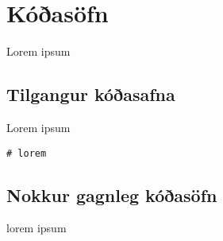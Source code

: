 
\chapter{Kóðasöfn}\label{k:import}
Lorem ipsum

\section{Tilgangur kóðasafna}\label{uk:kóðasöfn-kynnt}
Lorem ipsum
\begin{lstlisting}[caption=??, label=lst:kóðasöfn-kynnt]
# lorem
\end{lstlisting}

\section{Nokkur gagnleg kóðasöfn}\label{uk:kóðasöfn-gagnleg}
lorem ipsum
